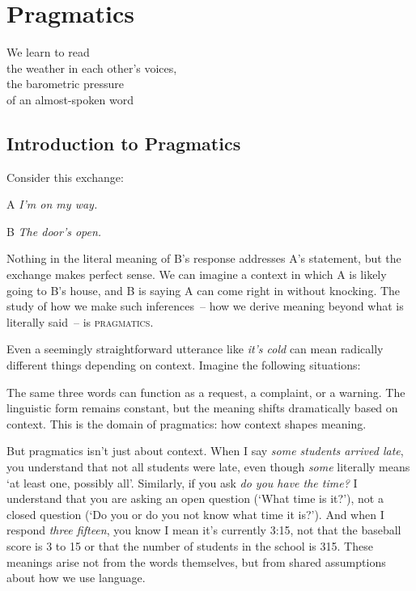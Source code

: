\chapter{Pragmatics} \label{ch:pragmatics}

\epigraph{We learn to read\\
the weather in each other's voices,\\
the barometric pressure\\
of an almost-spoken word}{}

\section{Introduction to Pragmatics}

Consider this exchange:

\begin{dialogue}
\item[A] \textit{I'm on my way.}
\item[B] \textit{The door's open.}
\end{dialogue}

Nothing in the literal meaning of B's response addresses A's statement, but the exchange makes perfect sense. We can imagine a context in which A is likely going to B's house, and B is saying A can come right in without knocking. The study of how we make such inferences~-- how we derive meaning beyond what is literally said~-- is \textsc{pragmatics}.

Even a seemingly straightforward utterance like \textit{it's cold} can mean radically different things depending on context. Imagine the following situations:

\ea
    \z
\z

The same three words can function as a request, a complaint, or a warning. The linguistic form remains constant, but the meaning shifts dramatically based on context. This is the domain of pragmatics: how context shapes meaning.

But pragmatics isn't just about context. When I say \textit{some students arrived late}, you understand that not all students were late, even though \textit{some} literally means `at least one, possibly all'. Similarly, if you ask \textit{do you have the time?} I understand that you are asking an open question (`What time is it?'), not a closed question (`Do you or do you not know what time it is?'). And when I respond \textit{three fifteen}, you know I mean it's currently 3:15, not that the baseball score is 3 to 15 or that the number of students in the school is 315. These meanings arise not from the words themselves, but from shared assumptions about how we use language.

